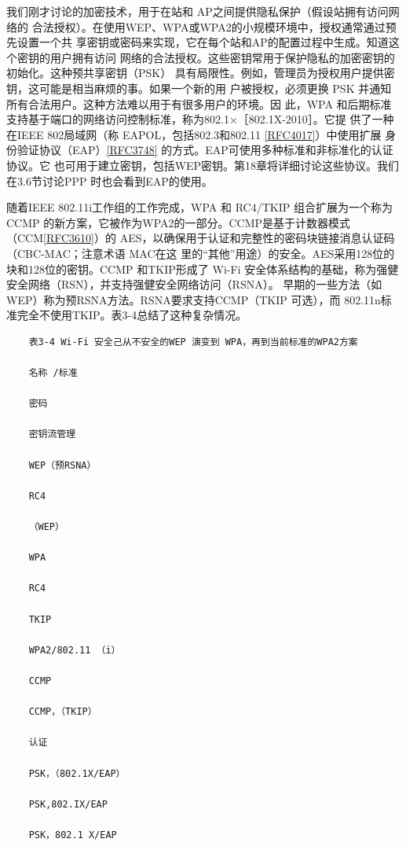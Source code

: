 我们刚才讨论的加密技术，用于在站和 AP之间提供隐私保护（假设站拥有访问网络的
合法授权）。在使用WEP、WPA或WPA2的小规模环境中，授权通常通过预先设置一个共
享密钥或密码来实现，它在每个站和AP的配置过程中生成。知道这个密钥的用户拥有访问
网络的合法授权。这些密钥常用于保护隐私的加密密钥的初始化。这种预共享密钥（PSK）
具有局限性。例如，管理员为授权用户提供密钥，这可能是相当麻烦的事。如果一个新的用
户被授权，必须更换 PSK 并通知所有合法用户。这种方法难以用于有很多用户的环境。因
此，WPA 和后期标准支持基于端口的网络访问控制标准，称为802.1×［802.1X-2010］。它提
供了一种在IEEE 802局域网（称 EAPOL，包括802.3和802.11 \href{https://www.rfc-editor.org/rfc/rfc4017}{[RFC4017]}）中使用扩展
身份验证协议（EAP）\href{https://www.rfc-editor.org/rfc/rfc3748}{[RFC3748]} 的方式。EAP可使用多种标准和非标准化的认证协议。它
也可用于建立密钥，包括WEP密钥。第18章将详细讨论这些协议。我们在3.6节讨论PPP
时也会看到EAP的使用。

随着IEEE 802.11i工作组的工作完成，WPA 和 RC4/TKIP 组合扩展为一个称为CCMP
的新方案，它被作为WPA2的一部分。CCMP是基于计数器模式（CCM\href{https://www.rfc-editor.org/rfc/rfc3610}{[RFC3610]}）的
AES，以确保用于认证和完整性的密码块链接消息认证码（CBC-MAC；注意术语 MAC在这
里的“其他”用途）的安全。AES采用128位的块和128位的密钥。CCMP 和TKIP形成了
Wi-Fi 安全体系结构的基础，称为强健安全网络（RSN），并支持强健安全网络访问（RSNA）。
早期的一些方法（如WEP）称为预RSNA方法。RSNA要求支持CCMP（TKIP 可选），而
802.11n标准完全不使用TKIP。表3-4总结了这种复杂情况。

\begin{verbatim}
    表3-4 Wi-Fi 安全己从不安全的WEP 演变到 WPA，再到当前标准的WPA2方案
    
    名称 /标准
    
    密码
    
    密钥流管理
    
    WEP（预RSNA）
    
    RC4
    
    （WEP）
    
    WPA
    
    RC4
    
    TKIP
    
    WPA2/802.11 （i）
    
    CCMP
    
    CCMP，（TKIP）
    
    认证
    
    PSK，（802.1X/EAP）
    
    PSK,802.IX/EAP
    
    PSK，802.1 X/EAP
\end{verbatim}

